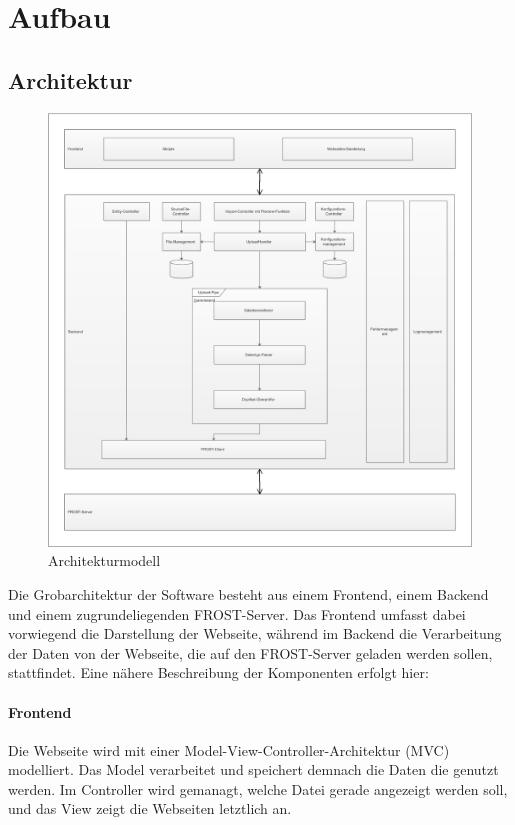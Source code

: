 \section{Aufbau}

\subsection{Architektur}
\begin{figure}[htbp]
\centering
\includegraphics[scale=0.44]{uml/architektur.eps}
\caption{\label{fig:architektur} Architekturmodell}
\end{figure}

Die Grobarchitektur der Software besteht aus einem Frontend, einem Backend und einem zugrundeliegenden FROST-Server. Das Frontend umfasst dabei vorwiegend die Darstellung der Webseite, während im Backend die Verarbeitung der Daten von der Webseite, die auf den FROST-Server geladen werden sollen, stattfindet. Eine nähere Beschreibung der Komponenten erfolgt hier:

\paragraph{Frontend}
Die Webseite wird mit einer Model-View-Controller-Architektur (MVC) modelliert.
Das Model verarbeitet und speichert demnach die Daten die genutzt werden.
Im Controller wird gemanagt, welche Datei gerade angezeigt werden soll, und das View zeigt die Webseiten letztlich an.

